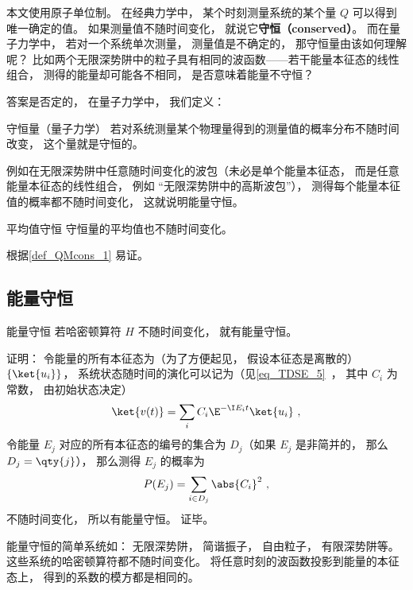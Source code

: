 

本文使用原子单位制。 在经典力学中， 某个时刻测量系统的某个量 $Q$ 可以得到唯一确定的值。 如果测量值不随时间变化， 就说它\textbf{守恒（conserved）}。 而在量子力学中， 若对一个系统单次测量， 测量值是不确定的， 那守恒量由该如何理解呢？ 比如两个无限深势阱中的粒子具有相同的波函数——若干能量本征态的线性组合， 测得的能量却可能各不相同， 是否意味着能量不守恒？

答案是否定的， 在量子力学中， 我们定义：
\begin{definition}{守恒量（量子力学）}\label{def_QMcons_1}
若对系统测量某个物理量得到的测量值的概率分布不随时间改变， 这个量就是守恒的。
\end{definition}

例如在无限深势阱中任意随时间变化的波包（未必是单个能量本征态， 而是任意能量本征态的线性组合， 例如 “无限深势阱中的高斯波包”）， 测得每个能量本征值的概率都不随时间变化， 这就说明能量守恒。

\begin{corollary}{平均值守恒}
守恒量的平均值也不随时间变化。
\end{corollary}
根据\autoref{def_QMcons_1} 易证。

\subsection{能量守恒}

\begin{theorem}{能量守恒}
若哈密顿算符 $H$ 不随时间变化， 就有能量守恒。
\end{theorem}
证明： 令能量的所有本征态为（为了方便起见， 假设本征态是离散的） $\{\ket{u_i}\}$， 系统状态随时间的演化可以记为（见\autoref{eq_TDSE_5}~， 其中 $C_i$ 为常数， 由初始状态决定）
\begin{equation}
\ket{v(t)} = \sum_i C_i \E^{-\I E_i t} \ket{u_i}~,
\end{equation}
令能量 $E_j$ 对应的所有本征态的编号的集合为 $D_j$（如果 $E_j$ 是非简并的， 那么 $D_j = \qty{j}$），%
那么测得 $E_j$ 的概率为
\begin{equation}
P(E_j) = \sum_{i \in D_j} \abs{C_i}^2~,
\end{equation}
不随时间变化， 所以有能量守恒。 证毕。

\begin{example}{}
能量守恒的简单系统如： 无限深势阱， 简谐振子， 自由粒子， 有限深势阱等。 这些系统的哈密顿算符都不随时间变化。 将任意时刻的波函数投影到能量的本征态上， 得到的系数的模方都是相同的。
\end{example}

